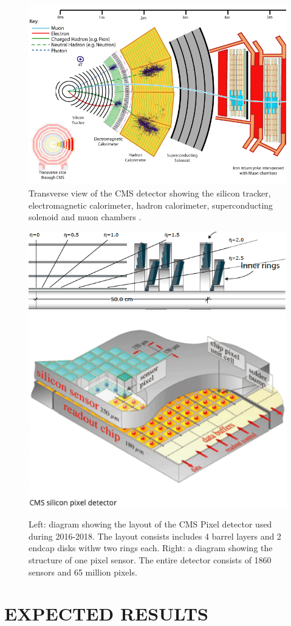 \documentclass[final,12p]{article}
\begin{document}
\begin{figure}[H]
  \centering
  \includegraphics[width=0.7\columnwidth]{./cms12.png}
  \caption{Transverse view of the CMS detector showing the silicon tracker, electromagnetic calorimeter, hadron calorimeter, superconducting solenoid and muon chambers \cite{Chatrchyan:2008aa}.}
  \label{fig:CMS}
\end{figure}

\begin{figure}[H]
  \centering
  \includegraphics[width=0.7\columnwidth,crop]{./PixelDetectorPhase1.png}
  \includegraphics[width=0.27\columnwidth]{./PixelSensor.png}
  \caption{
    Left: diagram showing the layout of the CMS Pixel detector used during 2016-2018.
    The layout consists includes 4 barrel layers and 2 endcap disks withw two rings each.
    Right: a diagram showing the structure of one pixel sensor.
    The entire detector consists of 1860 sensors and 65 million pixels.
  }
  \label{fig:pixeldet}
\end{figure}





\section{EXPECTED RESULTS}
\end{document}
